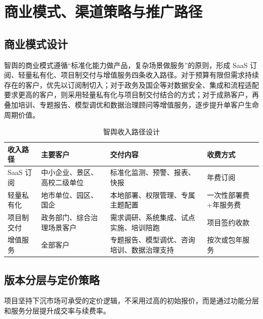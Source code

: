 \chapter{商业模式、渠道策略与推广路径}

\section{商业模式设计}

智舆的商业模式遵循“标准化能力做产品，复杂场景做服务”的原则，形成 SaaS 订阅、轻量私有化、项目制交付与增值服务四条收入路径。对于预算有限但需求持续存在的客户，优先以订阅制切入；对于政务及国企等对数据安全、集成和流程适配要求更高的客户，则采用轻量私有化与项目制交付结合的方式；对于成熟客户，再叠加培训、专题报告、模型调优和数据治理顾问等增值服务，逐步提升单客户生命周期价值。

\begin{table}[htbp]
	\centering
	\caption{智舆收入路径设计}
	\begin{tabularx}{\textwidth}{L{2.8cm}L{3cm}Y L{2.5cm}}
		\toprule
		收入路径    & 主要客户           & 交付内容                  & 收费方式        \\
		\midrule
		SaaS 订阅 & 中小企业、景区、高校二级单位 & 标准化监测、预警、报表、快报        & 年费订阅        \\
		轻量私有化   & 地市单位、园区、国企     & 本地部署、权限管理、专属主题配置      & 一次性部署费+年服务费 \\
		项目制交付   & 政务部门、综合治理场景客户  & 需求调研、系统集成、试点实施、培训陪跑   & 项目签约收款      \\
		增值服务    & 全部客户           & 专题报告、模型调优、咨询培训、数据治理支持 & 按次或包年服务     \\
		\bottomrule
	\end{tabularx}
\end{table}

\section{版本分层与定价策略}

项目坚持下沉市场可承受的定价逻辑，不采用过高的初始报价，而是通过功能分层和服务分层提升成交率与续费率。

